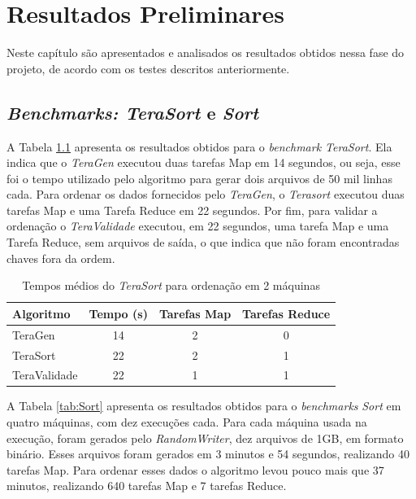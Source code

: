 \chapter{Resultados Preliminares}
\label{cap:resultados}

Neste capítulo são apresentados e analisados os resultados obtidos nessa fase do projeto, de acordo com os testes descritos anteriormente.

\section{\textit{Benchmarks: TeraSort} e \textit{Sort}}

A Tabela  \ref{tab:TeraSort} apresenta os resultados obtidos para o \textit{benchmark TeraSort}. Ela indica que o \textit{TeraGen} executou duas tarefas Map em 14 segundos, ou seja, esse foi o tempo utilizado pelo algoritmo para gerar dois arquivos de 50 mil linhas cada. Para ordenar os dados fornecidos pelo \textit{TeraGen}, o \textit{Terasort} executou duas tarefas Map e uma Tarefa Reduce em 22 segundos. Por fim, para validar a ordenação o \textit{TeraValidade} executou, em 22 segundos, uma tarefa Map e uma Tarefa Reduce, sem arquivos de saída, o que indica que não foram encontradas chaves fora da ordem.  

\begin{table}[htbp]
\centering
\begin{footnotesize}
\begin{tabular}{|l|c|c|c|} \hline
Algoritmo 		&Tempo (s)	 	&Tarefas Map 	&Tarefas Reduce \\ \hline \hline
TeraGen 			&14			&2					&0						\\ \hline 
TeraSort			&22			&2					&1						\\ \hline 
TeraValidade 	&22			&1					&1						\\ \hline 
\end{tabular}
\end{footnotesize}
\caption{Tempos médios do \textit{TeraSort} para ordenação em 2 máquinas}
\label{tab:TeraSort}
\end{table}

A Tabela \ref{tab:Sort} apresenta os resultados obtidos para o \textit{benchmarks} \textit{Sort} em quatro máquinas, com dez execuções cada. Para cada máquina usada na execução, foram gerados pelo \textit{RandomWriter}, dez arquivos de 1GB, em formato binário. Esses arquivos foram gerados  em 3 minutos e 54 segundos, realizando 40 tarefas Map. Para ordenar esses dados o algoritmo levou pouco mais que 37 minutos, realizando 640 tarefas Map e 7 tarefas Reduce.  


